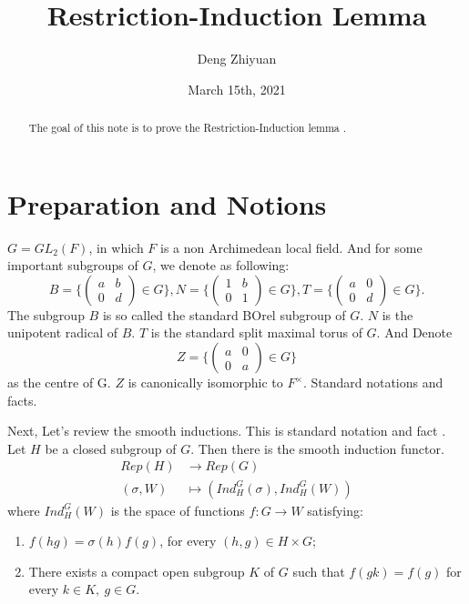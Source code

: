 \documentclass[12pt,a4paper,english]{article}
\title{Restriction-Induction Lemma}
\date{March 15th, 2021}
\author{Deng Zhiyuan}
\theoremstyle{plain}
\theoremstyle{definition}
\begin{document}
\maketitle
\begin{abstract}
    The goal of this note is to prove the Restriction-Induction lemma \cite{bushnell2006local}.
\end{abstract}
\vspace{0.5cm}
\section{Preparation and Notions}
$G=GL_{2}(F)$, in which $F$ is a non Archimedean local field. And for some important subgroups of $G$, we denote as following:
\begin{equation*}
    B=
    \bigg\{\begin{pmatrix} a & b \\ 0 & d \end{pmatrix}\in G\bigg\},
      N=
    \bigg\{\begin{pmatrix} 1 & b \\ 0 & 1 \end{pmatrix}\in G\bigg\},
        T=
    \bigg\{\begin{pmatrix} a & 0 \\ 0 & d \end{pmatrix}\in G\bigg\}.
\end{equation*}
The subgroup $B$ is so called the standard BOrel subgroup of $G$. $N$ is the unipotent radical of $B$. $T$ is the standard split maximal torus of $G$. And Denote 
\begin{equation*}
        Z=
    \bigg\{\begin{pmatrix} a & 0 \\ 0 & a \end{pmatrix}\in G\bigg\}
\end{equation*}
as the centre of G. $Z$ is canonically isomorphic to $F^{\times}$. Standard notations and facts\cite{bushnell2006local}.

Next, Let's review the smooth inductions.
This is standard notation and fact \cite{bushnell2006local}.
Let $H$ be a closed subgroup of $G$. Then there is the smooth induction functor.
\begin{align*}
    Rep(H)&\rightarrow Rep(G)\\
    (\sigma, W)&\mapsto (Ind^{G}_{H}(\sigma), Ind^{G}_{H}(W)) 
\end{align*}
where $Ind^{G}_{H}(W)$ is the space of functions $f: G\rightarrow W$ satisfying:
\begin{enumerate}
    \item $f(hg)=\sigma(h)f(g)$, for every $(h,g)\in H\times G$;
    \item There exists a compact open subgroup $K $ of $G$ such that $f(gk)=f(g)$ for every $k\in K,\ g\in G$.
\end{enumerate}
\end{document}
